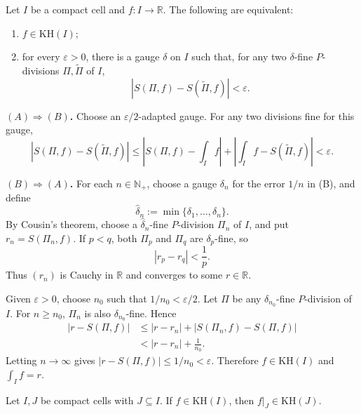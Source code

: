 
\begin{theoremenv}\label{thm:kh-cauchy}
Let $I$ be a compact cell and $f:I\to\mathbb R$. The following are equivalent:
\begin{enumerate}[label=(\Alph*)]
    \item $f\in\mathrm{KH}(I)$;
    \item for every $\varepsilon>0$, there is a gauge $\delta$ on $I$ such
    that, for any two $\delta$-fine $P$-divisions $\Pi,\widetilde\Pi$ of $I$,
    \[
        |S(\Pi,f)-S(\widetilde\Pi,f)|<\varepsilon.
    \]
\end{enumerate}
\end{theoremenv}

\begin{proofenv}
\textbf{$(A)\Rightarrow(B)$.} Choose an $\varepsilon/2$-adapted gauge.
For any two divisions fine for this gauge,
\[
    |S(\Pi,f)-S(\widetilde\Pi,f)|
    \le\left|S(\Pi,f)-\int_I f\right|
       +\left|\int_I f-S(\widetilde\Pi,f)\right|<\varepsilon.
\]

\textbf{$(B)\Rightarrow(A)$.} For each $n\in\mathbb N_+$, choose a gauge
$\delta_n$ for the error $1/n$ in (B), and define
\[
    \widehat\delta_n:=\min\{\delta_1,\ldots,\delta_n\}.
\]
By Cousin's theorem, choose a $\widehat\delta_n$-fine $P$-division $\Pi_n$
of $I$, and put $r_n=S(\Pi_n,f)$. If $p<q$, both $\Pi_p$ and $\Pi_q$
are $\delta_p$-fine, so
\[
    |r_p-r_q|<\frac1p.
\]
Thus $(r_n)$ is Cauchy in $\mathbb R$ and converges to some $r\in\mathbb R$.

Given $\varepsilon>0$, choose $n_0$ such that $1/n_0<\varepsilon/2$.
Let $\Pi$ be any $\delta_{n_0}$-fine $P$-division of $I$.
For $n\ge n_0$, $\Pi_n$ is also $\delta_{n_0}$-fine. Hence
\[
\begin{aligned}
    |r-S(\Pi,f)|
    &\le |r-r_n|+|S(\Pi_n,f)-S(\Pi,f)|\\
    &<|r-r_n|+\frac1{n_0}.
\end{aligned}
\]
Letting $n\to\infty$ gives
$|r-S(\Pi,f)|\le1/n_0<\varepsilon$.
Therefore $f\in\mathrm{KH}(I)$ and $\int_I f=r$.
\end{proofenv}

\begin{corollaryenv}[Subcells]\label{cor:kh-subcells}
Let $I,J$ be compact cells with $J\subseteq I$. If $f\in\mathrm{KH}(I)$,
then $f|_J\in\mathrm{KH}(J)$.
\end{corollaryenv}

